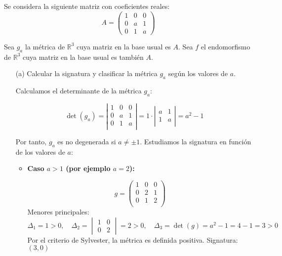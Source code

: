 \documentclass[12pt]{article}
\begin{document}
		\begin{ejercicio}[4 puntos]
		Se considera la siguiente matriz con coeficientes reales:
		\[
		A = \begin{pmatrix}
			1 & 0 & 0 \\
			0 & a & 1 \\
			0 & 1 & a
		\end{pmatrix}
		\]
		
		Sea $g_a$ la métrica de $\mathbb{R}^3$ cuya matriz en la base usual es $A$. Sea $f$ el endomorfismo de $\mathbb{R}^3$ cuya matriz en la base usual es también $A$.
		
		\begin{enumerate}
			\item[(a)] Calcular la signatura y clasificar la métrica $g_a$ según los valores de $a$.
			
			Calculamos el determinante de la métrica \( g_a \):
			
			\[
			\det(g_a) = \left|
			\begin{array}{ccc}
				1 & 0 & 0 \\
				0 & a & 1 \\
				0 & 1 & a \\
			\end{array}
			\right|
			= 1 \cdot \left|
			\begin{array}{cc}
				a & 1 \\
				1 & a \\
			\end{array}
			\right|
			= a^2 - 1
			\]
			
			Por tanto, \( g_a \) es no degenerada si \( a \neq \pm 1 \). Estudiamos la signatura en función de los valores de \( a \):
			
			\begin{itemize}
				\item \textbf{Caso \( a > 1 \) (por ejemplo \( a = 2 \)):}
				
				\[
				g = \begin{pmatrix}
					1 & 0 & 0 \\
					0 & 2 & 1 \\
					0 & 1 & 2 \\
				\end{pmatrix}
				\]
				Menores principales:
				\[
				\Delta_1 = 1 > 0, \quad
				\Delta_2 = \begin{vmatrix} 1 & 0 \\ 0 & 2 \end{vmatrix} = 2 > 0, \quad
				\Delta_3 = \det(g) = a^2 - 1 = 4 - 1 = 3 > 0
				\]
				Por el criterio de Sylvester, la métrica es definida positiva. Signatura: \( (3, 0) \)
				

\end{itemize}
\end{enumerate}
\end{ejercicio}
\end{document}
